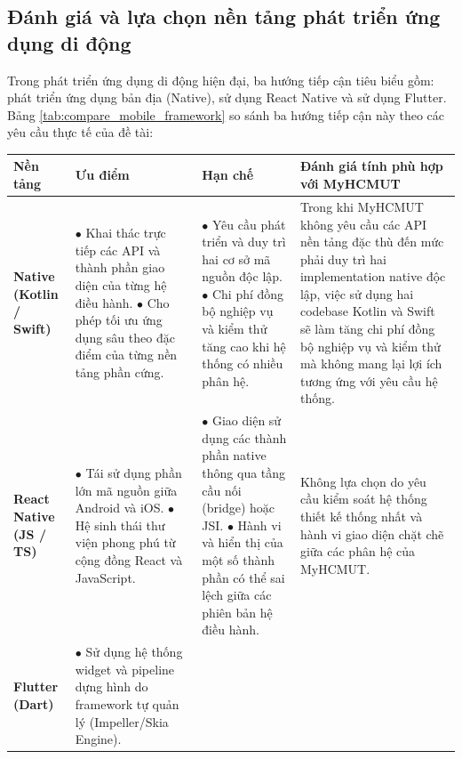 \subsection{Đánh giá và lựa chọn nền tảng phát triển ứng dụng di động}
\label{subsec:compare_mobile_framework}

Trong phát triển ứng dụng di động hiện đại, ba hướng tiếp cận tiêu biểu gồm: phát triển ứng dụng bản địa (Native), sử dụng React Native và sử dụng Flutter. Bảng \ref{tab:compare_mobile_framework} so sánh ba hướng tiếp cận này theo các yêu cầu thực tế của đề tài:

\begin{table}[H]
    \centering
    \small
    \renewcommand{\arraystretch}{1.25}
    \begin{tabularx}{\textwidth}{|L{2.5cm}|Y|Y|L{3.3cm}|}
    \hline
    \textbf{Nền tảng} & \textbf{Ưu điểm} & \textbf{Hạn chế} & \textbf{Đánh giá tính phù hợp với MyHCMUT} \\ 
    \hline 
    \textbf{Native (Kotlin / Swift)} & $\bullet$ Khai thác trực tiếp các API và thành phần giao diện của từng hệ điều hành. 
    \newline 
    $\bullet$ Cho phép tối ưu ứng dụng sâu theo đặc điểm của từng nền tảng phần cứng. & $\bullet$ Yêu cầu phát triển và duy trì hai cơ sở mã nguồn độc lập. 
    \newline 
    $\bullet$ Chi phí đồng bộ nghiệp vụ và kiểm thử tăng cao khi hệ thống có nhiều phân hệ. & Trong khi MyHCMUT không yêu cầu các API nền tảng đặc thù đến mức phải duy trì hai implementation native độc lập, việc sử dụng hai codebase Kotlin và Swift sẽ làm tăng chi phí đồng bộ nghiệp vụ và kiểm thử mà không mang lại lợi ích tương ứng với yêu cầu hệ thống. \\ 
    \hline 
    \textbf{React Native (JS / TS)} & $\bullet$ Tái sử dụng phần lớn mã nguồn giữa Android và iOS. 
    \newline 
    $\bullet$ Hệ sinh thái thư viện phong phú từ cộng đồng React và JavaScript. & $\bullet$ Giao diện sử dụng các thành phần native thông qua tầng cầu nối (bridge) hoặc JSI. 
    \newline 
    $\bullet$ Hành vi và hiển thị của một số thành phần có thể sai lệch giữa các phiên bản hệ điều hành. & Không lựa chọn do yêu cầu kiểm soát hệ thống thiết kế thống nhất và hành vi giao diện chặt chẽ giữa các phân hệ của MyHCMUT. \\ 
    \hline 
    \textbf{Flutter (Dart)} & $\bullet$ Sử dụng hệ thống widget và pipeline dựng hình do framework tự quản lý (Impeller/Skia Engine). 

\end{tabularx}
\end{table}
